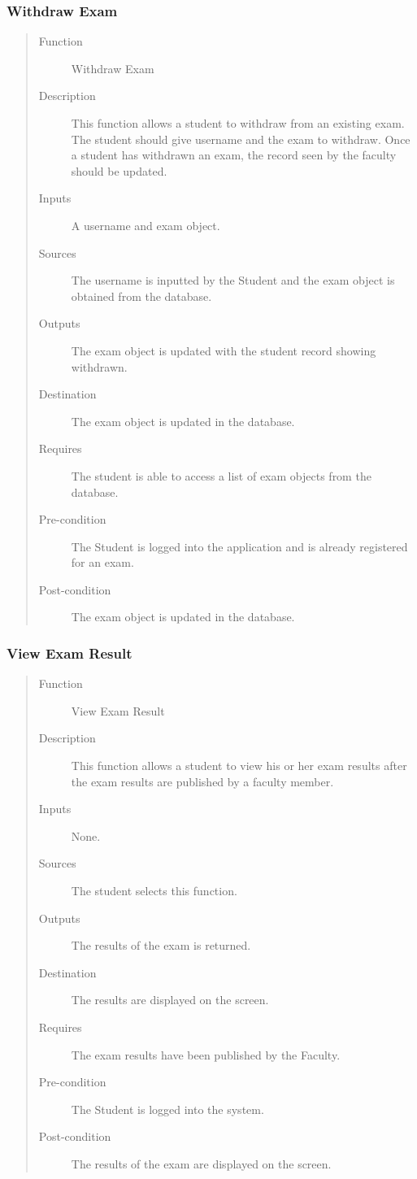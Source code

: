 \subsubsection{Withdraw Exam} 
\begin{quote} %
\begin{description}
\item[Function]
   Withdraw Exam
\item[Description]
   This function allows a student to withdraw from an existing exam. The student
   should give username and the exam to withdraw. Once a student has withdrawn
   an exam, the record seen by the faculty should be updated.
\item[Inputs]
   A username and exam object.
\item[Sources]
   The username is inputted by the Student and the exam object is obtained from
   the database.
\item[Outputs]
   The exam object is updated with the student record showing withdrawn.
\item[Destination]
   The exam object is updated in the database.
\item[Requires]
   The student is able to access a list of exam objects from the database.
\item[Pre-condition]
   The Student is logged into the application and is already registered for an
   exam.
\item[Post-condition]
   The exam object is updated in the database.
\end{description}
\end{quote} %

\subsubsection{View Exam Result} 
\begin{quote} %
\begin{description}
\item[Function]
   View Exam Result
\item[Description]
   This function allows a student to view his or her exam results after the exam
   results are published by a faculty member.
\item[Inputs]
   None.
\item[Sources]
   The student selects this function.
\item[Outputs]
   The results of the exam is returned.
\item[Destination]
   The results are displayed on the screen.
\item[Requires]
   The exam results have been published by the Faculty.
\item[Pre-condition]
   The Student is logged into the system.
\item[Post-condition]
   The results of the exam are displayed on the screen.
\end{description}
\end{quote} %
